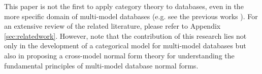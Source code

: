  

 This paper is not the first to apply category theory to databases, even in the more specific domain of multi-model databases (e.g. see the previous works \cite{video,journals/jbd/KoupilH22}). For an extensive review of the related literature, please refer to Appendix \ref{sec:relatedwork}. However, note that the contribution of this research lies not only in the development of a categorical model for multi-model databases but also in proposing a cross-model normal form theory for understanding the fundamental principles of multi-model database normal forms. 
 
 
 
 
 



 








